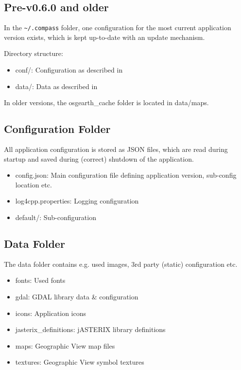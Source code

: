 \subsection{Pre-v0.6.0 and older}

In the \texttt{\textasciitilde/.compass} folder, one configuration for the most current application version exists, which is kept up-to-date with an update mechanism.

Directory structure:
\begin{itemize}
\item conf/: Configuration as described in 
\item data/: Data as described in 
\end{itemize}

In older versions, the osgearth\_cache folder is located in data/maps.

\subsection{Configuration Folder}
\label{sec:appendix_config_config_folder}

All application configuration is stored as JSON files, which are read during startup and saved during (correct) shutdown of the application.

\begin{itemize}
\item config.json: Main configuration file defining application version, sub-config location etc.
\item log4cpp.properties: Logging configuration
\item default/: Sub-configuration
\end{itemize}

\subsection{Data Folder}
\label{sec:appendix_config_data_folder}

The data folder contains e.g. used images, 3rd party (static) configuration etc.

\begin{itemize}
\item fonts: Used fonts
\item gdal: GDAL library data \& configuration
\item icons: Application icons
\item jasterix\_definitions: jASTERIX library definitions
\item maps: Geographic View map files
\item textures: Geographic View symbol textures
\end{itemize}

